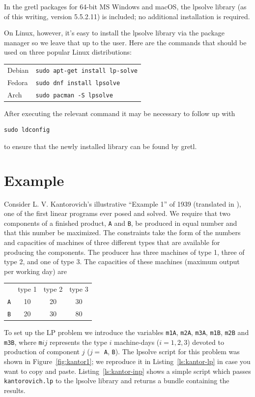 \documentclass{article}
\begin{document}
In the gretl packages for 64-bit MS Windows and macOS, the
\textsf{lpsolve} library (as of this writing, version 5.5.2.11) is
included; no additional installation is required.

On Linux, however, it's easy to install the \textsf{lpsolve} library
via the package manager so we leave that up to the user. Here are the
commands that should be used on three popular Linux distributions:
\begin{center}
  \begin{tabular}{ll}
  Debian & \texttt{sudo apt-get install lp-solve} \\
  Fedora & \texttt{sudo dnf install lpsolve} \\
  Arch & \texttt{sudo pacman -S lpsolve}
\end{tabular}
\end{center}
After executing the relevant command it may be necessary to follow up
with
\begin{verbatim}
sudo ldconfig
\end{verbatim}
to ensure that the newly installed library can be found by gretl.

\section{Example}
\label{sec:example}

Consider L. V. Kantorovich's illustrative ``Example 1'' of 1939
(translated in \cite{kantorovich60}), one of the first linear programs
ever posed and solved. We require that two components of a finished
product, \texttt{A} and \texttt{B}, be produced in equal number and
that this number be maximized. The constraints take the form of the
numbers and capacities of machines of three different types that are
available for producing the components. The producer has three
machines of type 1, three of type 2, and one of type 3. The capacities
of these machines (maximum output per working day) are

\begin{center}
\begin{tabular}{cccc}
  & type 1 & type 2 & type 3 \\
  \texttt{A} & 10 & 20 & 30 \\
  \texttt{B} & 20 & 30 & 80 
\end{tabular}
\end{center}

To set up the LP problem we introduce the variables \texttt{m1A},
\texttt{m2A}, \texttt{m3A}, \texttt{m1B}, \texttt{m2B} and
\texttt{m3B}, where \texttt{m}$ij$ represents the type $i$
machine-days ($i=1,2,3$) devoted to production of component $j$ ($j=$
\texttt{A}, \texttt{B}).  The \textsf{lpsolve} script for this problem
was shown in Figure~\ref{fig:kantor1}; we reproduce it in
Listing~\ref{ls:kantor-lp} in case you want to copy and
paste. Listing~\ref{ls:kantor-inp} shows a simple script which passes
\texttt{kantorovich.lp} to the \textsf{lpsolve} library and returns a
bundle containing the results.
\end{document}

